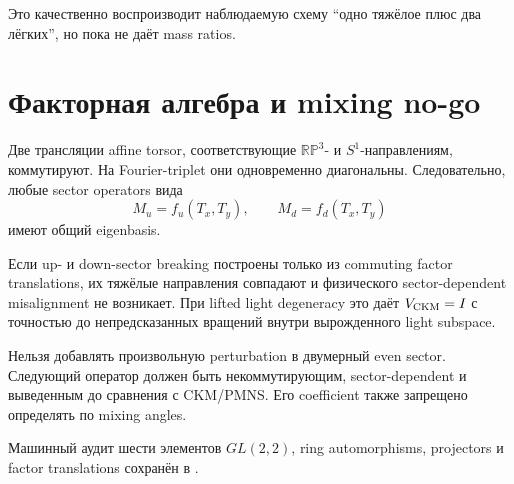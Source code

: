 Это качественно воспроизводит наблюдаемую схему ``одно тяжёлое плюс два
лёгких'', но пока не даёт mass ratios.

\section{Факторная алгебра и mixing no-go}

Две трансляции affine torsor, соответствующие \(\mathbb{RP}^3\)- и
\(S^1\)-направлениям, коммутируют. На Fourier-triplet они одновременно
диагональны. Следовательно, любые sector operators вида
\begin{equation}
M_u=f_u(T_x,T_y),
\qquad
M_d=f_d(T_x,T_y)
\end{equation}
имеют общий eigenbasis.

\begin{proposition}
Если up- и down-sector breaking построены только из commuting factor
translations, их тяжёлые направления совпадают и физического
sector-dependent misalignment не возникает. При lifted light degeneracy это
даёт \(V_{\rm CKM}=I\) с точностью до непредсказанных вращений внутри
вырожденного light subspace.
\end{proposition}

\begin{nogocriterion}
Нельзя добавлять произвольную perturbation в двумерный even sector. Следующий
оператор должен быть некоммутирующим, sector-dependent и выведенным до
сравнения с CKM/PMNS. Его coefficient также запрещено определять по mixing
angles.
\end{nogocriterion}

Машинный аудит шести элементов \(GL(2,2)\), ring automorphisms, projectors и
factor translations сохранён в
.